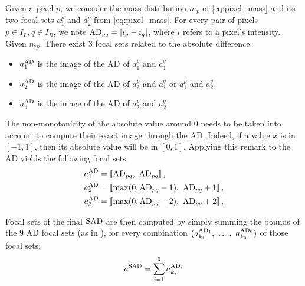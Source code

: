 Given a pixel $p$, we consider the mass distribution $m_p$ of \cref{eq:pixel_mass} and its two focal sets $a_1^p$ and $a_2^p$ from \cref{eq:pixel_mass}. For every pair of pixels $p\in I_L, q\in I_R$, we note $\mathrm{AD}_{pq}=|i_p - i_q|$, where $i$ refers to a pixel's intensity. Given $m_p$, There exist $3$ focal sets related to the absolute difference:
\begin{itemize}
    \item $a^{\mathrm{AD}}_1$ is the image of the AD of $a^p_1$ and $a^q_1$
    \item $a^{\mathrm{AD}}_2$ is the image of the AD of $a^p_2$ and $a^q_1$ or $a^p_1$ and $a^q_2$
    \item  $a^{\mathrm{AD}}_3$ is the image of the AD of $a^p_2$ and $a^q_2$
\end{itemize}
The non-monotonicity of the absolute value around $0$ needs to be taken into account to compute their exact image through the AD. Indeed, if a value $x$ is in $[-1,1]$, then its absolute value will be in $[0,1]$. Applying this remark to the AD yields the following focal sets:
\begin{align*}
    a^{\mathrm{AD}}_1&=[\![\mathrm{AD}_{pq},~\mathrm{AD}_{pq}]\!]\,,\\
    a^{\mathrm{AD}}_2&=[\![\max(0, \mathrm{AD}_{pq} - 1),~\mathrm{AD}_{pq} + 1]\!]\,,\\
    a^{\mathrm{AD}}_3&=[\![\max(0, \mathrm{AD}_{pq} - 2),~\mathrm{AD}_{pq} + 2]\!]\,,
\end{align*}

Focal sets of the final $\mathrm{SAD}$ are then computed by simply summing the bounds of the $9$ AD focal sets (as in ), for every combination $(a^{\mathrm{AD}_1}_{k_1}, ~\dots, ~ a^{\mathrm{AD}_9}_{k_9})$ of those focal sets:
\begin{align}
    a^{\mathrm{SAD}}=\sum_{i=1}^9a^{\mathrm{AD}_i}_{k_i}
\end{align}

